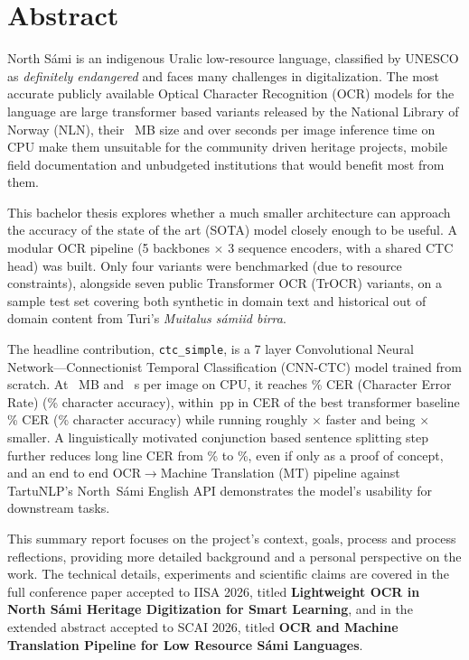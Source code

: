\chapter*{Abstract}


North S\'{a}mi is an indigenous Uralic low-resource language, classified by UNESCO as \textit{definitely endangered} and faces many challenges in digitalization. The most accurate publicly available Optical Character Recognition (OCR) models for the language are large transformer based variants released by the National Library of Norway (NLN), their \trocrSize{}~MB size and over \trocrInferenceIntroSec{} seconds per image inference time on CPU make them unsuitable for the community driven heritage projects, mobile field documentation and unbudgeted institutions that would benefit most from them.

This bachelor thesis explores whether a much smaller architecture can approach the accuracy of the state of the art (SOTA) model closely enough to be useful. A modular OCR pipeline (5 backbones $\times$ 3 sequence encoders, with a shared CTC head) was built. Only four variants were benchmarked (due to resource constraints), alongside seven public Transformer OCR (TrOCR) variants, on a \testSamples{} sample test set covering both synthetic in domain text and historical out of domain content from Turi's \turiYear{} \textit{Muitalus s\'{a}miid birra}.

The headline contribution, \texttt{ctc\_simple}, is a 7 layer Convolutional Neural Network---Connectionist Temporal Classification (CNN-CTC) model trained from scratch. At \ctcSize{}~MB and \ctcTime{}~s per image on CPU, it reaches \ctcCER{}\% CER (Character Error Rate) (\ctcCharAcc{}\% character accuracy), within \cerGap{}\,pp in CER of the best transformer baseline \trocrBestCER{}\% CER (\trocrBestCharAcc{}\% character accuracy) while running roughly \speedupFactor{}$\times$ faster and being \sizeRatio{}$\times$ smaller. A linguistically motivated conjunction based sentence splitting step further reduces long line CER from \splitLongOriginalCER{}\% to \splitLongSplitCER{}\%, even if only as a proof of concept, and an end to end OCR$\rightarrow$Machine Translation (MT) pipeline against TartuNLP's North~S\'{a}mi English API demonstrates the model's usability for downstream tasks.

This summary report focuses on the project's context, goals, process and process reflections, providing more detailed background and a personal perspective on the work. The technical details, experiments and scientific claims are covered in the full conference paper accepted to IISA 2026, titled \textbf{Lightweight OCR in North S\'{a}mi Heritage Digitization for Smart Learning}, and in the extended abstract accepted to SCAI 2026, titled \textbf{OCR and Machine Translation Pipeline for Low Resource S\'{a}mi Languages}.
